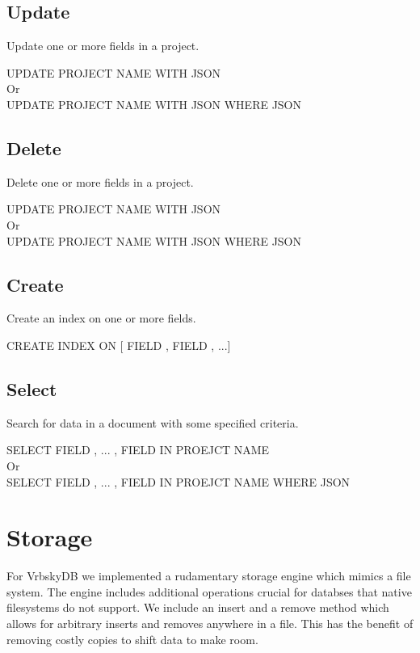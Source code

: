 \documentclass{article}
\newcommand\la{\textlangle\xspace}
\newcommand\ra{\textrangle\xspace}
\begin{document}
\subsection{Update}
Update one or more fields in a project.
\begin{center}
UPDATE \la PROJECT NAME \ra WITH \la JSON \ra \\
Or \\
UPDATE \la PROJECT NAME \ra WITH \la JSON \ra WHERE \la JSON \ra
\end{center}
\clearpage
\subsection{Delete}
Delete one or more fields in a project.
\begin{center}
UPDATE \la PROJECT NAME \ra WITH \la JSON \ra \\
Or \\
UPDATE \la PROJECT NAME \ra WITH \la JSON \ra WHERE \la JSON \ra
\end{center}

\subsection{Create}
Create an index on one or more fields.
\begin{center}
CREATE INDEX ON [\la FIELD \ra, \la FIELD \ra, ...]
\end{center}

\subsection{Select}
Search for data in a document with some specified criteria.
\begin{center}
SELECT \la FIELD \ra, ... , \la FIELD \ra IN \la PROEJCT NAME \ra \\
Or \\
SELECT \la FIELD \ra, ... , \la FIELD \ra IN \la PROEJCT NAME \ra WHERE \la JSON \ra
\end{center}

\section{Storage}

For VrbskyDB we implemented a rudamentary storage engine which mimics a file system.
The engine includes additional operations crucial for databses that native filesystems do not support.
We include an insert and a remove method which allows for arbitrary inserts and removes anywhere in a file.
This has the benefit of removing costly copies to shift data to make room.
\end{document}
